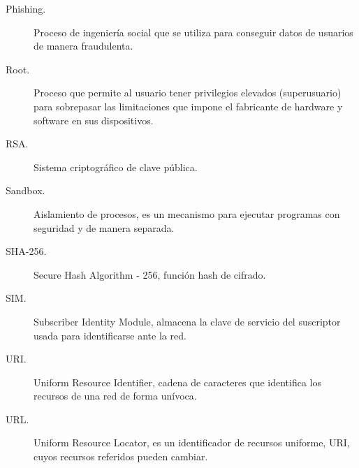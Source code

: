 \documentclass[a4paper,11pt]{report}
\begin{document}
\begin{description}
\item[Phishing.] Proceso de ingeniería social que se utiliza para conseguir datos de usuarios de manera fraudulenta.
\item[Root.] Proceso que permite al usuario tener privilegios elevados (superusuario) para sobrepasar las limitaciones que impone el fabricante de hardware y software en sus dispositivos.
\item[RSA.] Sistema criptográfico de clave pública.
\item[Sandbox.] Aislamiento de procesos, es un mecanismo para ejecutar programas con seguridad y de manera separada.
\item[SHA-256.] Secure Hash Algorithm - 256, función hash de cifrado.
\item[SIM.] Subscriber Identity Module, almacena la clave de servicio del suscriptor usada para identificarse ante la red.
\item[URI.] Uniform Resource Identifier, cadena de caracteres que identifica los recursos de una red de forma unívoca.
\item[URL.]  Uniform Resource Locator, es un identificador de recursos uniforme, URI, cuyos recursos referidos pueden cambiar.
\end{description}
\end{document}

